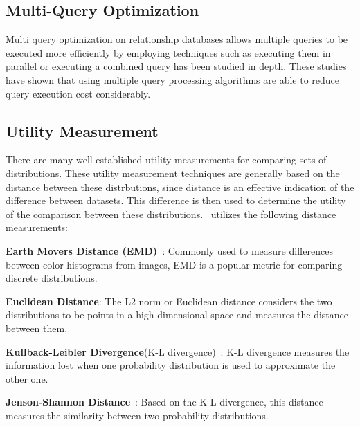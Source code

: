\subsection{Multi-Query Optimization}

Multi query optimization on relationship databases allows multiple queries to be executed more efficiently by employing techniques such as executing them in parallel or executing a combined query has been studied in depth. These studies have shown that using multiple query processing algorithms are able to reduce query execution cost considerably.

\subsection{Utility Measurement}

There are many well-established utility measurements for comparing sets of distributions. These utility measurement techniques are generally based on the distance between these distrbutions, since distance is an effective indication of the difference between datasets. This difference is then used to determine the utility of the comparison between these distributions. \SeeDB\ utilizes the following distance measurements: \\


 \squishlist
   \item {\bf Earth Movers Distance (EMD)}~\cite{wikipedia-prob-dist}: Commonly used to
   measure differences between color histograms from images, EMD is a popular metric for comparing
   discrete distributions.
   \item {\bf Euclidean Distance}: The L2 norm or
   Euclidean distance considers the two distributions to be points in a high
   dimensional space and measures the distance between them.
   \item {\bf Kullback-Leibler Divergence}(K-L divergence)~\cite{wikipedia-KL}:
   K-L divergence measures the information lost when one probability distribution is used to approximate
   the other one.
   \item {\bf Jenson-Shannon Distance}~\cite{wikipedia-JS,entropy-vis}: Based on
   the K-L divergence, this distance measures the similarity between two probability distributions.
 \squishend
 